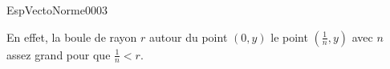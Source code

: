 \begin{corrige}{EspVectoNorme0003}
\begin{enumerate}
			En effet, la boule de rayon $r$ autour du point $(0,y)$ le point $(\frac{1}{ n },y)$ avec $n$ assez grand pour que $\frac{1}{ n }<r$.

	\end{enumerate}

\end{corrige}
